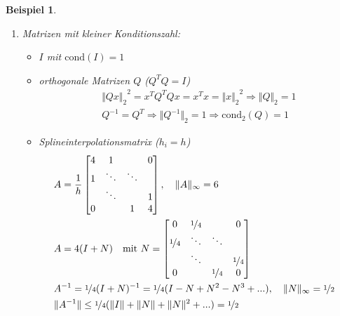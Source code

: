 \documentclass[12pt]{article}
\theoremstyle{break}
\newtheorem{example}[theorem]{Beispiel}
\begin{document}
\begin{example}\leavevmode
\renewcommand{\labelenumi}{\theenumi) }
\begin{enumerate}
  \item Matrizen mit kleiner Konditionszahl:
    \begin{itemize}
      \item $I$ mit $\text{cond}(I) = 1$
      \item orthogonale Matrizen $Q$ ($Q^TQ = I$)
        \begin{align*}
        &{\Vert Qx \Vert_2}^2 = x^TQ^T Q x = x^Tx = {\Vert x \Vert_2}^2 \Rightarrow \Vert Q \Vert_2 = 1 &\\
        & Q^{-1} = Q^T \Rightarrow \Vert Q^{-1} \Vert_2 = 1 \Rightarrow \text{cond}_2(Q) = 1
        \end{align*}
      \item Splineinterpolationsmatrix ($h_i = h$)
        \begin{align*}
        &A = \frac{1}{h} \left[ \begin{matrix} 4 & 1 & & 0 \\ 1 & \ddots & \ddots \\  & \ddots & & 1 \\ 0 & & 1 & 4\end{matrix} \right], \quad \Vert A \Vert_{\infty} = 6 &\\
        &A = 4(I+N) \quad \text{mit } N = \left[ \begin{matrix} 0 & \nicefrac{1}{4} & & 0 \\ \nicefrac{1}{4} & \ddots & \ddots \\  & \ddots & & \nicefrac{1}{4} \\ 0 & & \nicefrac{1}{4} & 0 \end{matrix} \right] &\\
        &A^{-1} = \nicefrac{1}{4}(I+N)^{-1} = \nicefrac{1}{4} (I-N+N^2-N^3 + ...), \quad \Vert N \Vert_{\infty} = \nicefrac{1}{2} &\\
        &\Vert A ^{-1} \Vert \leq \nicefrac{1}{4}(\Vert I \Vert + \Vert N \Vert + \Vert N \Vert ^2 + ...) = \nicefrac{1}{2}
        \end{align*}
    \end{itemize}
  

\end{enumerate}
\end{example}
\end{document}
